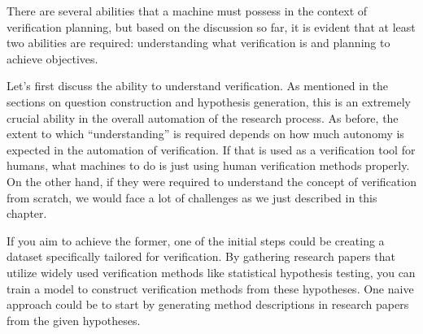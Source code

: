 

There are several abilities that a machine must possess in the context of verification planning, but based on the discussion so far, it is evident that at least two abilities are required: understanding what verification is and planning to achieve objectives.

Let's first discuss the ability to understand verification. As mentioned in the sections on question construction and hypothesis generation, this is an extremely crucial ability in the overall automation of the research process. As before, the extent to which ``understanding'' is required depends on how much autonomy is expected in the automation of verification. If that is used as a verification tool for humans, what machines to do is just using human verification methods properly. On the other hand, if they were required to understand the concept of verification from scratch, we would face a lot of challenges as we just described in this chapter. 

If you aim to achieve the former, one of the initial steps could be creating a dataset specifically tailored for verification. By gathering research papers that utilize widely used verification methods like statistical hypothesis testing, you can train a model to construct verification methods from these hypotheses. One naive approach could be to start by generating method descriptions in research papers from the given hypotheses. 

